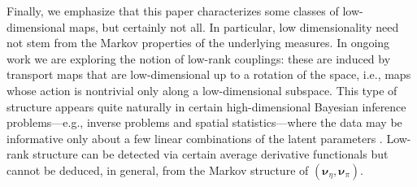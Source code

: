\documentclass[twoside,11pt]{article}
\newcommand{\genm}{\boldsymbol{\nu} }   %
\begin{document}
%
%
%
%
%
%


%
%
%
%
%
%
%
%
%
%
%
%

Finally, we emphasize that this paper characterizes some
classes of low-dimensional maps, but certainly not all.
%
In particular, low dimensionality need not stem from the Markov
properties of the underlying measures.
%
In ongoing work we are exploring the notion of low-rank couplings:
these are induced by transport maps that are low-dimensional up to a
rotation of the space, i.e., maps whose action is nontrivial only
along a low-dimensional subspace.  This type of
structure appears quite naturally in certain high-dimensional
Bayesian inference problems---e.g., inverse problems
\citep{stuart2010inverse} and spatial statistics---where the data may be
informative only about a few linear combinations of the latent
parameters \citep{spantini2014optimal,cui2014likelihood,spantini2016goal}.  Low-rank
structure can be detected via certain average derivative functionals
\citep{samarov1993exploring,constantine2014active} but cannot be
deduced, in general, from the Markov structure of
$(\genm_\eta,\genm_\pi)$.


%
%
%
%
%
%
%
%
%
%
%
%
%
%
%
%
%
%
%
%
%
%
%
%
%
%
%
%
%
%

%
%
%
%
%
%
%
%
 

%
%

 
%
%

%
%
%
%
%

%
%
%
%
%
%
%
%
%
%
%
%
%
%
%
%
%
%
%
%
%
%
%
%
%
%
%
%
%
%
%
%
%
%
%
%
%
%
%
%
%
%
%
%
%
%
%
%
%
%

%
%
%
%
%
%
%
%
%
%
%
%
%
%
%
%
%
%
%
%
%
%
%

%

%


%
%
%
%
%
%
%
%
%
%
%

%

%
%
%
%
%
%
%
%
%
        
%
%
%
%
%
%
%
%
%
%
%
%
%

%
          
%
%
%

%


%
%
%
%

%
%

%

%
%

%
%
%

%
%
%
%
%
%
%

%
%
%
%
%
%
%
%
%
%

%
%
%
%
%
%
%
%
%

%
%
%
%
%
%
%
%
%
%
%
%
%
\end{document}
